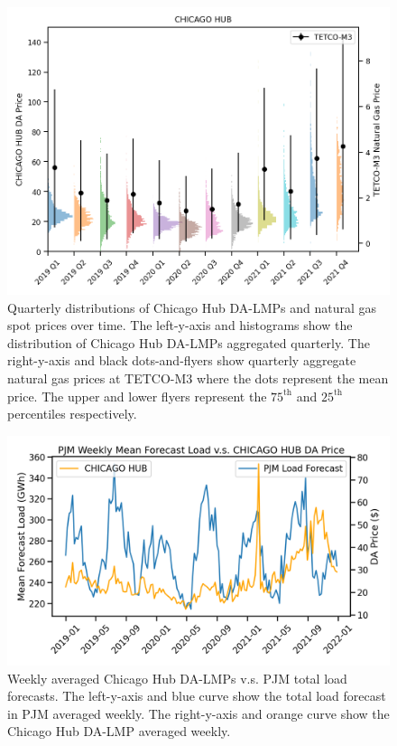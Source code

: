 \begin{figure}[htbp]
    \caption[Quarterly aggregated day-ahead prices v.s. natural gas spot prices]{
        Quarterly distributions of Chicago Hub DA-LMPs and natural gas spot prices over time.
        The left-y-axis and histograms show the distribution of Chicago Hub DA-LMPs aggregated
        quarterly.
        The right-y-axis and black dots-and-flyers show quarterly aggregate natural gas prices at TETCO-M3
        where the dots represent the mean price. The upper and lower flyers represent the $75^{\text{th}}$ and
        $25^{\text{th}}$ percentiles respectively.
    }
    \begin{center}
        \setlength{\fboxsep}{0pt}%
        \setlength{\fboxrule}{1pt}%
        \includegraphics[width=120mm]{figs/chicago_hub_tetco_dists}
    \end{center}
    \label{fig:price_gas_hist}
\end{figure}

\begin{figure}[htbp]
    \caption[Total aggregate load v.s. day-ahead prices]{
        Weekly averaged Chicago Hub DA-LMPs v.s. PJM total load forecasts.
        The left-y-axis and blue curve show the total load forecast in PJM averaged weekly.
        The right-y-axis and orange curve show the Chicago Hub DA-LMP averaged weekly.
    }
    \begin{center}
        \setlength{\fboxsep}{0pt}%
        \setlength{\fboxrule}{1pt}%
        \includegraphics[width=120mm]{figs/load_vs_price}
    \end{center}
    \label{fig:weekly_load}
\end{figure}

